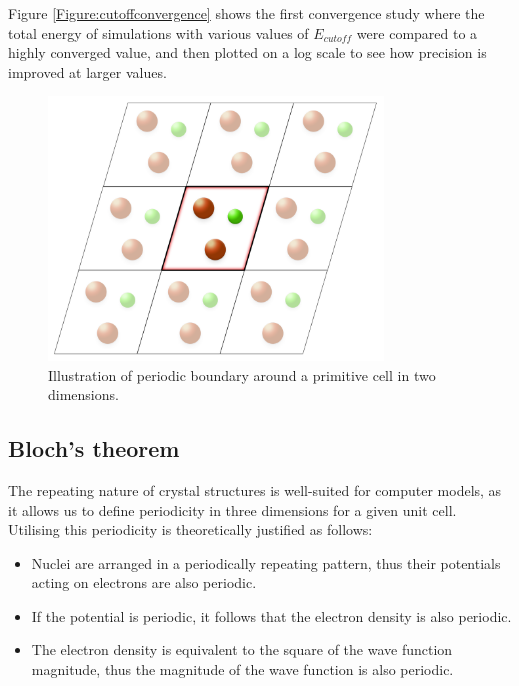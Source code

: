 Figure \ref{Figure:cutoffconvergence} shows the first convergence study where the total energy of simulations with various values of $E_{cutoff}$ were compared to a highly converged value, and then plotted on a log scale to see how precision is improved at larger values.

\begin{figure} %
\label{figure:periodicboundary}
\begin{center}
\includegraphics[height=7cm]{images/PeriodicBoundary.png}
\end{center}
\caption{Illustration of periodic boundary around a primitive cell in two dimensions.}
\end{figure}

\subsection{Bloch's theorem}

The repeating nature of crystal structures is well-suited for computer models, as it allows us to define periodicity in three dimensions for a given unit cell. Utilising this periodicity is theoretically justified as follows:

\begin{itemize}

\item Nuclei are arranged in a periodically repeating pattern, thus their potentials acting on electrons are also periodic.

\item If the potential is periodic, it follows that the electron density is also periodic.

\item The electron density is equivalent to the square of the wave function magnitude, thus the magnitude of the wave function is also periodic.

\end{itemize}

